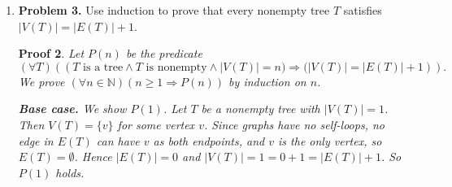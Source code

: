 \documentclass[12pt]{article}
\newcommand{\defeq}{\mathrel{\vcenter{\baselineskip0.5ex \lineskiplimit0pt
                     \hbox{\scriptsize.}\hbox{\scriptsize.}}}=}
\newcommand{\N}{\mathbb{N}}
\theoremstyle{proofstyle}
\newtheorem*{proof*}{Proof}
\begin{document}
\begin{enumerate}[left=0pt, itemsep=2em, parsep=1em]
\begin{proof*}
\textbf{Case 1:} $w \notin S$. Define $p' : (k+2) \to V(T)$ by
$p'(i) \defeq p(i)$ for $0 \leq i \leq k$ and $p'(k+1) \defeq w$. Since $w \notin S$,
$w$ is distinct from every vertex in $S$, so $p'$ is injective and
hence $p'$ is a path of length $k+1$, contradicting the maximality of $p$.

\textbf{Case 2:} $w \in S$. Then $(\exists j \in \N)(0 \leq j \leq k \text{ and } w = p(j))$.
Fix such a $j$. Since $\{w, v\} \in E(T)$ and graphs have no self-loops, $w \neq v = p(k)$,
so $j \neq k$. Since $w \neq p(k-1)$ by choice of $w$, we have $j \leq k - 2$.

Define the walk $c : (k - j + 2) \to V(T)$ by $c(i) \defeq p(j + i)$ for
$0 \leq i \leq k - j$ and $c(k - j + 1) \defeq p(j)$. Then $c(0) = c(k - j + 1) = p(j)$,
consecutive vertices are connected by edges of $p$, the last edge
$\{c(k-j), c(k-j+1)\} = \{p(k), p(j)\} = \{v, w\} \in E(T)$, and no vertex repeats
except $p(j)$ at the start and end (by injectivity of $p$). So $c$ is a cycle in $T$,
but $T$ is a tree, so $T$ contains no cycles --- a contradiction.

Both cases yield a contradiction, so $\deg_T(v) = 1$ and $v$ is a leaf. \qed

\end{proof*}

\newpage

\item[]
\begin{questionbox}
\textbf{Problem 3.} Use induction to prove that every nonempty tree $T$ satisfies $|V(T)| = |E(T)| + 1$.
\end{questionbox}

\begin{proof*}

Let $P(n)$ be the predicate
\[
  (\forall T)((T \text{ is a tree} \land T \text{ is nonempty} \land
  |V(T)| = n\bigr) \Rightarrow \bigl(|V(T)| = |E(T)| + 1)).
\]
We prove $(\forall n \in \N)(n \geq 1 \Rightarrow P(n))$ by induction on $n$.

\textbf{Base case.} We show $P(1)$. Let $T$ be a nonempty tree with $|V(T)| = 1$.
Then $V(T) = \{v\}$ for some vertex $v$. Since graphs have no self-loops, no edge in $E(T)$
can have $v$ as both endpoints, and $v$ is the only vertex, so $E(T) = \emptyset$.
Hence $|E(T)| = 0$ and $|V(T)| = 1 = 0 + 1 = |E(T)| + 1$. So $P(1)$ holds.


\end{proof*}
\end{enumerate}
\end{document}
